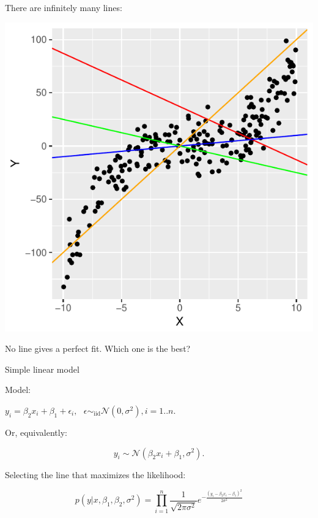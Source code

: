 \begin{frame}
\begin{analysis}

\smallskip

There are infinitely many lines:

\bigskip
\begin{center}
\includegraphics[width=0.40\linewidth]{../LectureAssets/L04/SimpleReg02}
\end{center}

\smallskip

No line gives a perfect fit. Which one is the best?

\smallskip
\end{analysis}
\end{frame}


\begin{frame}{Simple linear model}

Model:

\bigskip

$ y_i = \beta_2 x_{i} + \beta_1 + \epsilon_i, \text{   }$\hfill$\epsilon \sim_\text{iid} \mathcal{N}(0, \sigma^2), i = 1..n$.

\bigskip

Or, equivalently:

\bigskip

$$y_i \sim \mathcal{N}(\beta_2 x_{i} + \beta_1, \sigma^2).$$

\bigskip

Selecting the line that maximizes the likelihood:

$$p( y |  x, \beta_1, \beta_2, \sigma^2) = \prod_{i=1}^n \frac{1}{\sqrt{2\pi\sigma^2}} e^{-\frac{(y_i - \beta_2 x_{i} - \beta_1)^2}{2\sigma^2}}$$

\end{frame}

